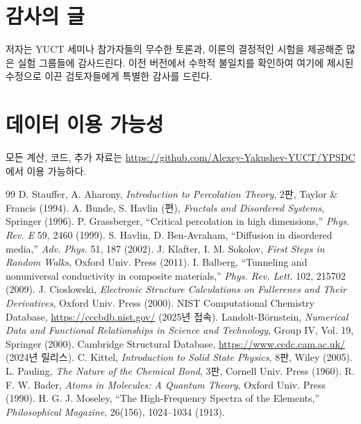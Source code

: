 \documentclass[12pt,a4paper]{article}
\begin{document}
	\section*{감사의 글}
	
	저자는 YUCT 세미나 참가자들의 무수한 토론과, 이론의 결정적인 시험을 제공해준 많은 실험 그룹들에 감사드린다. 이전 버전에서 수학적 불일치를 확인하여 여기에 제시된 수정으로 이끈 검토자들에게 특별한 감사를 드린다.
	
	\section*{데이터 이용 가능성}
	
	모든 계산, 코드, 추가 자료는 \url{https://github.com/Alexey-Yakushev-YUCT/YPSDC}에서 이용 가능하다.
	
	\begin{thebibliography}{99}
		 D. Stauffer, A. Aharony, \emph{Introduction to Percolation Theory}, 2판, Taylor \& Francis (1994).
		 A. Bunde, S. Havlin (편), \emph{Fractals and Disordered Systems}, Springer (1996).
		 P. Grassberger, ``Critical percolation in high dimensions,'' \emph{Phys. Rev. E} 59, 2460 (1999).
		 S. Havlin, D. Ben-Avraham, ``Diffusion in disordered media,'' \emph{Adv. Phys.} 51, 187 (2002).
		 J. Klafter, I. M. Sokolov, \emph{First Steps in Random Walks}, Oxford Univ. Press (2011).
		 I. Balberg, ``Tunneling and nonuniversal conductivity in composite materials,'' \emph{Phys. Rev. Lett.} 102, 215702 (2009).
		 J. Cioslowski, \emph{Electronic Structure Calculations on Fullerenes and Their Derivatives}, Oxford Univ. Press (2000).
		 NIST Computational Chemistry Database, \url{https://cccbdb.nist.gov/} (2025년 접속).
		 Landolt-Börnstein, \emph{Numerical Data and Functional Relationships in Science and Technology}, Group IV, Vol. 19, Springer (2000).
		 Cambridge Structural Database, \url{https://www.ccdc.cam.ac.uk/} (2024년 릴리스).
		 C. Kittel, \emph{Introduction to Solid State Physics}, 8판, Wiley (2005).
		 L. Pauling, \emph{The Nature of the Chemical Bond}, 3판, Cornell Univ. Press (1960).
		 R. F. W. Bader, \emph{Atoms in Molecules: A Quantum Theory}, Oxford Univ. Press (1990).
		 H. G. J. Moseley, ``The High-Frequency Spectra of the Elements,'' \emph{Philosophical Magazine}, 26(156), 1024–1034 (1913).
	\end{thebibliography}
	
\end{document}
